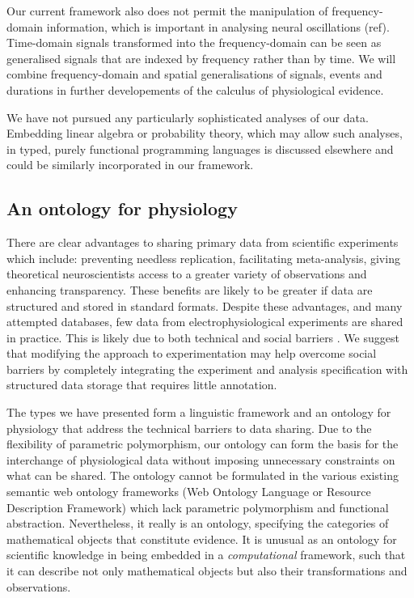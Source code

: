 Our current framework also does not permit the manipulation of
frequency-domain information, which is important in analysing neural
oscillations (ref). Time-domain signals transformed into the
frequency-domain can be seen as generalised signals that are indexed
by frequency rather than by time. We will combine frequency-domain and
spatial generalisations of signals, events and durations in further
developements of the calculus of physiological evidence.

We have not pursued any particularly sophisticated analyses of our
data. Embedding linear algebra or probability theory, which may allow
such analyses, in typed, purely functional programming languages is
discussed elsewhere \citep{Eaton2006, Park2005} and could be similarly
incorporated in our framework.

\subsection*{An ontology for physiology}

There are clear advantages to sharing primary data from scientific
experiments \citep{Insel2003} which include: preventing needless replication,
facilitating meta-analysis, giving theoretical neuroscientists access
to a greater variety of observations and enhancing transparency. These
benefits are likely to be greater if data are structured and stored in
standard formats. Despite these advantages, and many attempted
databases, few data from electrophysiological experiments are
shared in practice. This is likely due to both technical and social
barriers \citep{Amari2002}. We suggest that modifying the approach to
experimentation may help overcome social barriers by completely
integrating the experiment and analysis specification with structured
data storage that requires little annotation.

The types we have presented form a linguistic framework and an
ontology for physiology that address the technical barriers to data
sharing. Due to the flexibility of parametric polymorphism, our
ontology can form the basis for the interchange of physiological data
without imposing unnecessary constraints on what can be shared. The
ontology cannot be formulated in the various existing semantic web
ontology frameworks (Web Ontology Language or Resource Description
Framework) which lack parametric polymorphism and functional
abstraction. Nevertheless, it really is an ontology, specifying the
categories of mathematical objects that constitute evidence. It is
unusual as an ontology for scientific knowledge in being embedded in a
\emph{computational} framework, such that it can describe not only
mathematical objects but also their transformations and observations.

